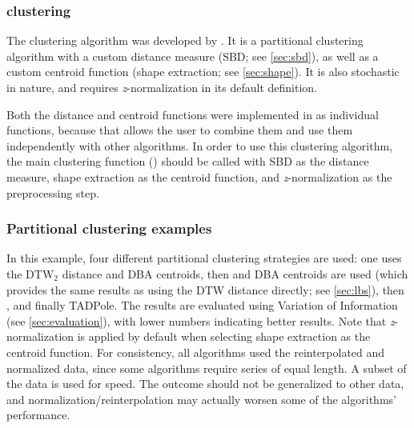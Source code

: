 \subsubsection{\kshape{} clustering}
\label{sec:kshape}

The \kshape{} clustering algorithm was developed by \citet{paparrizos2015}.
It is a partitional clustering algorithm with a custom distance measure (SBD; see \cref{sec:sbd}),
as well as a custom centroid function (shape extraction; see \cref{sec:shape}).
It is also stochastic in nature,
and requires \textit{z}-normalization in its default definition.

Both the distance and centroid functions were implemented in \dtwclust{} as individual functions,
because that allows the user to combine them and use them independently with other algorithms.
In order to use this clustering algorithm,
the main clustering function () should be called with SBD as the distance measure,
shape extraction as the centroid function,
and \textit{z}-normalization as the preprocessing step.

\subsubsection{Partitional clustering examples}

In this example,
four different partitional clustering strategies are used:
one uses the $\text{DTW}_2$ distance and DBA centroids,
then  and DBA centroids are used
(which provides the same results as using the DTW distance directly; see \cref{sec:lbs}),
then \kshape{},
and finally TADPole.
The results are evaluated using Variation of Information (see \cref{sec:evaluation}),
with lower numbers indicating better results.
Note that \textit{z}-normalization is applied by default when selecting shape extraction as the centroid function.
For consistency, all algorithms used the reinterpolated and normalized data,
since some algorithms require series of equal length.
A subset of the data is used for speed.
The outcome should not be generalized to other data,
and normalization/reinterpolation may actually worsen some of the algorithms' performance.


